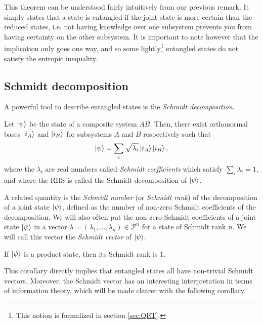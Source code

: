 This theorem can be understood fairly intuitively from our previous remark. It simply states that a state is entangled if the joint state is more certain than the reduced states, i.e. not having knowledge over one subsystem prevents you from having certainty on the other subsystem. It is important to note however that the implication only goes one way, and so some lightly\footnote{This notion is formalized in section \ref{sec:QRT}.} entangled states do not satisfy the entropic inequality.

\subsection{Schmidt decomposition}

A powerful tool to describe entangled states is the \textit{Schmidt decomposition}.

\begin{theorem}
    Let $\ket{\psi}$ be the state of a composite system $AB$. Then, there exist orthonormal bases $\ket{i_A}$ and $\ket{i_B}$ for subsystems $A$ and $B$ respectively such that
    \begin{equation}
        \ket{\psi} = \sum_i \sqrt{\lambda_i} \ket{i_A} \ket{i_B},
    \end{equation}
    where the $\lambda_i$ are real numbers called \textit{Schmidt coefficients} which satisfy $\sum_i \lambda_i = 1$, and where the RHS is called the Schmidt decomposition of $\ket{\psi}$.
\end{theorem}

A related quantity is the \textit{Schmidt number} (or \textit{Schmidt rank}) of the decomposition of a joint state $\ket{\psi}$, defined as the number of non-zero Schmidt coefficients of the decomposition. We will also often put the non-zero Schmidt coefficients of a joint state $\ket{\psi}$ in a vector $\lambda = (\lambda_1, \dots, \lambda_n) \in \mathcal{P}^n$ for a state of Schmidt rank $n$. We will call this vector the \textit{Schmidt vector} of $\ket{\psi}$.

\begin{corollary}
    If $\ket{\psi}$ is a product state, then its Schmidt rank is 1.
\end{corollary}

This corollary directly implies that entangled states all have non-trivial Schmidt vectors. Moreover, the Schmidt vector has an interesting interpretation in terms of information theory, which will be made clearer with the following corollary.

